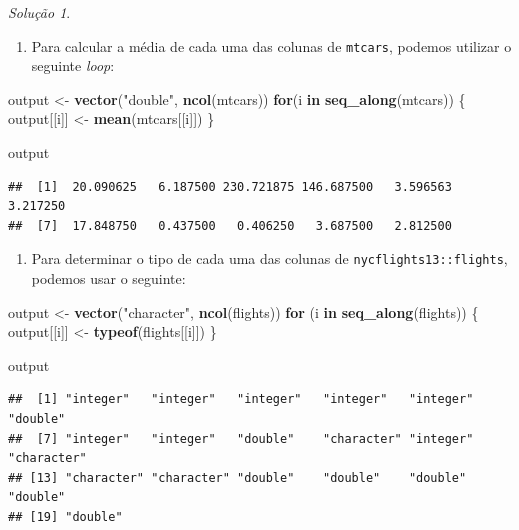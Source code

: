 \documentclass[
]{latex/krantz}
\newenvironment{Shaded}{\begin{snugshade}}{\end{snugshade}}
\newcommand{\ControlFlowTok}[1]{\textcolor[rgb]{0.13,0.29,0.53}{\textbf{#1}}}
\newcommand{\FunctionTok}[1]{\textcolor[rgb]{0.13,0.29,0.53}{\textbf{#1}}}
\newcommand{\NormalTok}[1]{#1}
\newcommand{\OtherTok}[1]{\textcolor[rgb]{0.56,0.35,0.01}{#1}}
\newcommand{\StringTok}[1]{\textcolor[rgb]{0.31,0.60,0.02}{#1}}
\providecommand{\tightlist}{%
  \setlength{\itemsep}{0pt}\setlength{\parskip}{0pt}}
\theoremstyle{definition}
\theoremstyle{definition}
\theoremstyle{definition}
\theoremstyle{definition}
\theoremstyle{remark}
\newtheorem*{solution}{Solução}
\begin{document}
\begin{solution}
\leavevmode

\begin{enumerate}
\def\labelenumi{\alph{enumi}.}
\tightlist
\item
  Para calcular a média de cada uma das colunas de \texttt{mtcars}, podemos utilizar o seguinte \emph{loop}:
\end{enumerate}

\begin{Shaded}
\begin{Highlighting}[]
\NormalTok{output }\OtherTok{\textless{}{-}} \FunctionTok{vector}\NormalTok{(}\StringTok{"double"}\NormalTok{, }\FunctionTok{ncol}\NormalTok{(mtcars))}
\ControlFlowTok{for}\NormalTok{(i }\ControlFlowTok{in} \FunctionTok{seq\_along}\NormalTok{(mtcars)) \{}
\NormalTok{  output[[i]] }\OtherTok{\textless{}{-}} \FunctionTok{mean}\NormalTok{(mtcars[[i]])}
\NormalTok{\}}

\NormalTok{output}
\end{Highlighting}
\end{Shaded}

\begin{verbatim}
##  [1]  20.090625   6.187500 230.721875 146.687500   3.596563   3.217250
##  [7]  17.848750   0.437500   0.406250   3.687500   2.812500
\end{verbatim}

\begin{enumerate}
\def\labelenumi{\alph{enumi}.}
\setcounter{enumi}{1}
\tightlist
\item
  Para determinar o tipo de cada uma das colunas de \texttt{nycflights13::flights}, podemos usar o seguinte:
\end{enumerate}

\begin{Shaded}
\begin{Highlighting}[]
\NormalTok{output }\OtherTok{\textless{}{-}} \FunctionTok{vector}\NormalTok{(}\StringTok{"character"}\NormalTok{, }\FunctionTok{ncol}\NormalTok{(flights))}
\ControlFlowTok{for}\NormalTok{ (i }\ControlFlowTok{in} \FunctionTok{seq\_along}\NormalTok{(flights)) \{}
\NormalTok{  output[[i]] }\OtherTok{\textless{}{-}} \FunctionTok{typeof}\NormalTok{(flights[[i]])}
\NormalTok{\}}

\NormalTok{output}
\end{Highlighting}
\end{Shaded}

\begin{verbatim}
##  [1] "integer"   "integer"   "integer"   "integer"   "integer"   "double"   
##  [7] "integer"   "integer"   "double"    "character" "integer"   "character"
## [13] "character" "character" "double"    "double"    "double"    "double"   
## [19] "double"
\end{verbatim}


\end{solution}
\end{document}
